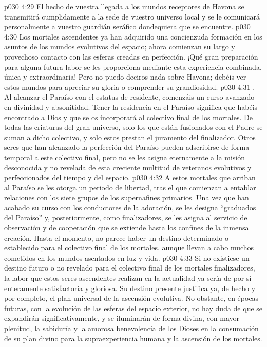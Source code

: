 \vs p030 4:29 El hecho de vuestra llegada a los mundos receptores de Havona se transmitirá cumplidamente a la sede de vuestro universo local y se le comunicará personalmente a vuestro guardián seráfico dondequiera que se encuentre.
\vs p030 4:30 Los mortales ascendentes ya han adquirido una concienzuda formación en los asuntos de los mundos evolutivos del espacio; ahora comienzan su largo y provechoso contacto con las esferas creadas en perfección. ¡Qué gran preparación para alguna futura labor se les proporciona mediante esta experiencia combinada, única y extraordinaria! Pero no puedo deciros nada sobre Havona; debéis ver estos mundos para apreciar su gloria o comprender su grandiosidad.
\vs p030 4:31 . Al alcanzar el Paraíso con el estatus de residente, comenzáis un curso avanzado en divinidad y absonitidad. Tener la residencia en el Paraíso significa que habéis encontrado a Dios y que se os incorporará al colectivo final de los mortales. De todas las criaturas del gran universo, solo los que están fusionados con el Padre se suman a dicho colectivo, y solo estos prestan el juramento del finalizador. Otros seres que han alcanzado la perfección del Paraíso pueden adscribirse de forma temporal a este colectivo final, pero no se les asigna eternamente a la misión desconocida y no revelada de esta creciente multitud de veteranos evolutivos y perfeccionados del tiempo y del espacio.
\vs p030 4:32 A estos mortales que arriban al Paraíso se les otorga un periodo de libertad, tras el que comienzan a entablar relaciones con los siete grupos de los supernafines primarios. Una vez que han acabado su curso con los conductores de la adoración, se les designa “graduados del Paraíso” y, posteriormente, como finalizadores, se les asigna al servicio de observación y de cooperación que se extiende hasta los confines de la inmensa creación. Hasta el momento, no parece haber un destino determinado o establecido para el colectivo final de los mortales, aunque llevan a cabo muchos cometidos en los mundos asentados en luz y vida.
\vs p030 4:33 Si no existiese un destino futuro o no revelado para el colectivo final de los mortales finalizadores, la labor que estos seres ascendentes realizan en la actualidad ya sería de por sí enteramente satisfactoria y gloriosa. Su destino presente justifica ya, de hecho y por completo, el plan universal de la ascensión evolutiva. No obstante, en épocas futuras, con la evolución de las esferas del espacio exterior, no hay duda de que se expandirán significativamente, y se iluminarán de forma divina, con mayor plenitud, la sabiduría y la amorosa benevolencia de los Dioses en la consumación de su plan divino para la supraexperiencia humana y la ascensión de los mortales.
